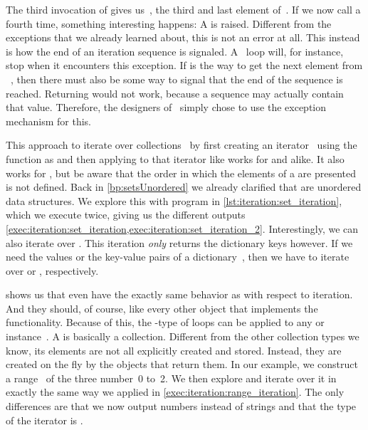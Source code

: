 The third invocation of  gives us~, the third and last element of~.
If we now call  a fourth time, something interesting happens:
A  is raised.
Different from the exceptions that we already learned about, this is not an error at all.
This instead is how the end of an iteration sequence is signaled.
A ~loop will, for instance, stop when it encounters this exception.
If  is the way to get the next element from ~, then there must also be some way to signal that the end of the sequence is reached.
Returning  would not work, because a sequence may actually contain that value.
Therefore, the designers of \python\ simply chose to use the exception mechanism for this.

This approach to iterate over collections~ by first creating an iterator~ using the  function as  and then applying  to that iterator like  works for  and  alike.
It also works for , but be aware that the order in which the elements of a  are presented is not defined.
Back in \cref{bp:setsUnordered} we already clarified that  are unordered data structures.
We explore this with program  in \cref{lst:iteration:set_iteration}, which we execute twice, giving us the different outputs \cref{exec:iteration:set_iteration,exec:iteration:set_iteration_2}.
Interestingly, we can also iterate over .
This iteration \emph{only} returns the dictionary keys however.
If we need the values or the key-value pairs of a dictionary~, then we have to iterate over  or , respectively.

 shows us that even  have the exactly same behavior as  with respect to iteration.
And they should, of course, like every other object that implements the~ functionality.
Because of this, the -type of loops can be applied to any  or  instance~.%
A  is basically a collection.
Different from the other collection types we know, its elements are not all explicitly created and stored.
Instead, they are created on the fly by the  objects that return them.
In our example, we construct a range~ of the three number~0 to~2.
We then explore and iterate over it in exactly the same way we applied in \cref{exec:iteration:range_iteration}.
The only differences are that we now output numbers instead of strings and that the type of the iterator is .

